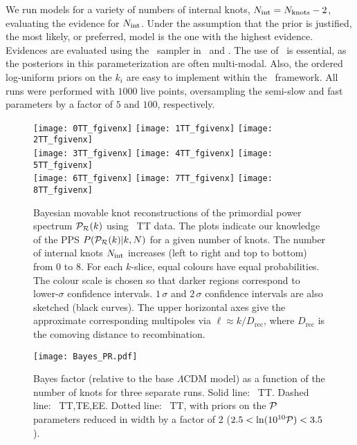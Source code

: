 We run models for a variety of numbers of internal knots, $N_\mathrm{int} =N_\mathrm{knots} -2$, evaluating the evidence for $N_\mathrm{int}$.
Under the assumption that the prior is justified, the most likely, or preferred, model is the one with the highest
evidence.  Evidences are evaluated using the \PolyChord\ sampler \citep{Polycord} 
in \CAMB\ and \CosmoMC. The use of \PolyChord\ is
essential, as the posteriors in this parameterization are often multi-modal. Also, the ordered log-uniform priors on
the $k_i$ are easy to implement within the \PolyChord\ framework. All runs were performed with $1000$ live points, 
oversampling the semi-slow and fast parameters by a factor of $5$ and $100$, respectively.

\begin{figure}
\begin{center}
  \texttt{[image: 0TT\_fgivenx]}
  \texttt{[image: 1TT\_fgivenx]}
  \texttt{[image: 2TT\_fgivenx]}\\
  \texttt{[image: 3TT\_fgivenx]}
  \texttt{[image: 4TT\_fgivenx]}
  \texttt{[image: 5TT\_fgivenx]}\\
  \texttt{[image: 6TT\_fgivenx]}
  \texttt{[image: 7TT\_fgivenx]}
  \texttt{[image: 8TT\_fgivenx]}
\end{center}
\caption{Bayesian movable knot reconstructions of the primordial power spectrum $\mathcal{P}_\mathcal{R}(k)$ using \Planck\ TT data.
The plots indicate our knowledge of the PPS $P(\mathcal{P}_\mathcal{R}(k)|k,N)$ for a given number of knots.
The number of internal knots $N_\mathrm{int}$ increases (left to right and top to bottom) from $0$ to $8$.
For each $k$-slice, equal colours have equal probabilities. The colour scale is chosen so that darker regions
correspond to lower-$\sigma$ confidence intervals.
$1\,\sigma $ and $2\,\sigma $ confidence intervals are also sketched (black curves).
The upper horizontal axes give the approximate corresponding multipoles via $\ell \approx k/D_\mathrm{rec}$,
where $D_\mathrm{rec}$ is the comoving distance to recombination.
    \label{fig:Pkr0}}
\end{figure}


\begin{figure}
\texttt{[image: Bayes\_PR.pdf]}
  \caption{
    Bayes factor (relative to the base $\Lambda$CDM model) as a function of the number of knots
for three separate runs. Solid line: \Planck\ TT. Dashed line: \Planck\ TT,TE,EE. Dotted line:
\Planck\ TT, with priors on the $\mathcal{P}$ parameters reduced in width by a factor of 2 ($2.5<\ln(10^{10}\mathcal{P})<3.5$).
\label{fig:Bayes_Factors}
}
\end{figure}

